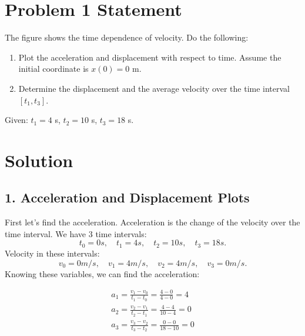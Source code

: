 \documentclass{article}
\begin{document}


\section*{Problem 1 Statement}
The figure shows the time dependence of velocity. Do the following:

\begin{enumerate}
    \item Plot the acceleration and displacement with respect to time. Assume the initial coordinate is $x(0) = 0$ m.
    \item Determine the displacement and the average velocity over the time interval $[t_1, t_3]$.
\end{enumerate}

Given: $t_1 = 4$ s, $t_2 = 10$ s, $t_3 = 18$ s.

\section*{Solution}

\subsection*{1. Acceleration and Displacement Plots}
First let's find the acceleration. Acceleration is the change of the velocity over the time interval.
We have 3 time intervals: 
\[
t_0 = 0s, \quad t_1 = 4s, \quad t_2 = 10s, \quad t_3 = 18s.
\]
Velocity in these intervals:
\[
v_0 = 0 m/s, \quad v_1 = 4m/s, \quad v_2 = 4m/s, \quad v_3 = 0m/s.
\]
Knowing these variables, we can find the acceleration:

\begin{align*}
a_1 = \frac{v_1 - v_0}{t_1 - t_0} = \frac{4 - 0}{4 - 0} = 4 \\
a_2 = \frac{v_2 - v_1}{t_2 - t_1} = \frac{4 - 4}{10 - 4} = 0 \\ 
a_3 = \frac{v_3 - v_2}{t_3 - t_2} = \frac{0 - 0}{18 - 10} = 0 \\
\end{align*}
\end{document}
